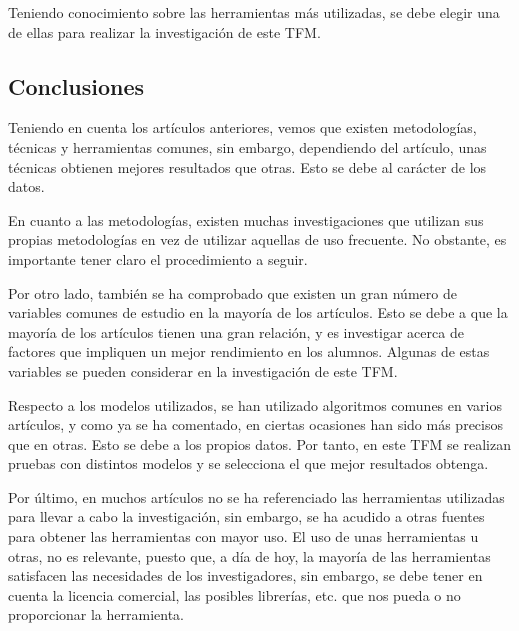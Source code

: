 Teniendo conocimiento sobre las herramientas más utilizadas, se debe elegir una de ellas para realizar la investigación de este TFM.



\subsection{Conclusiones}

Teniendo en cuenta los artículos anteriores, vemos que existen metodologías, técnicas y herramientas comunes, sin embargo, dependiendo del artículo, unas técnicas obtienen mejores resultados que otras. Esto se debe al carácter de los datos. 

En cuanto a las metodologías, existen muchas investigaciones que utilizan sus propias metodologías en vez de utilizar aquellas de uso frecuente. No obstante, es importante tener claro el procedimiento a seguir.

Por otro lado, también se ha comprobado que existen un gran número de variables comunes de estudio en la mayoría de los artículos. Esto se debe a que la mayoría de los artículos tienen una gran relación, y es investigar acerca de factores que impliquen un mejor rendimiento en los alumnos. Algunas de estas variables se pueden considerar en la investigación de este TFM.

Respecto a los modelos utilizados, se han utilizado algoritmos comunes en varios artículos, y como ya se ha comentado, en ciertas ocasiones han sido más precisos que en otras. Esto se debe a los propios datos. Por tanto, en este TFM se realizan pruebas con distintos modelos y se selecciona el que mejor resultados obtenga.

Por último, en muchos artículos no se ha referenciado las herramientas utilizadas para llevar a cabo la investigación, sin embargo, se ha acudido a otras fuentes para obtener las herramientas con mayor uso. El uso de unas herramientas u otras, no es relevante, puesto que, a día de hoy, la mayoría de las herramientas satisfacen las necesidades de los investigadores, sin embargo, se debe tener en cuenta la licencia comercial, las posibles librerías, etc. que nos pueda o no proporcionar la herramienta.


